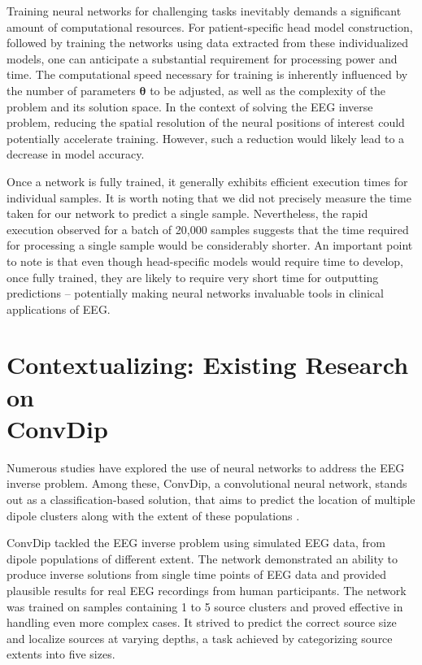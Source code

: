 \documentclass[a4paper, UKenglish, 11pt]{uiomaster}
\begin{document}
Training neural networks for challenging tasks inevitably demands a significant amount of computational resources. For patient-specific head model construction, followed by training the networks using data extracted from these individualized models, one can anticipate a substantial requirement for processing power and time. The computational speed necessary for training is inherently influenced by the number of parameters $\boldsymbol{\theta}$ to be adjusted, as well as the complexity of the problem and its solution space. In the context of solving the EEG inverse problem, reducing the spatial resolution of the neural positions of interest could potentially accelerate training. However, such a reduction would likely lead to a decrease in model accuracy.

Once a network is fully trained, it generally exhibits efficient execution times for individual samples. It is worth noting that we did not precisely measure the time taken for our network to predict a single sample. Nevertheless, the rapid execution observed for a batch of 20,000 samples suggests that the time required for processing a single sample would be considerably shorter. An important point to note is that even though head-specific models would require time to develop, once fully trained, they are likely to require very short time for outputting predictions -- potentially making neural networks invaluable tools in clinical applications of EEG.

\section{Contextualizing: Existing Research on \\ ConvDip} \label{sec:convdip}

Numerous studies have explored the use of neural networks to address the EEG inverse problem. Among these, ConvDip, a convolutional neural network, stands out as a classification-based solution, that aims to predict the location of multiple dipole clusters along with the extent of these populations \cite{hecker2021convdip}.

ConvDip tackled the EEG inverse problem using simulated EEG data, from dipole populations of different extent. The network demonstrated an ability to produce inverse solutions from single time points of EEG data and provided plausible results for real EEG recordings from human participants. The network was trained on samples containing 1 to 5 source clusters and proved effective in handling even more complex cases. It strived to predict the correct source size and localize sources at varying depths, a task achieved by categorizing source extents into five sizes.
\end{document}
